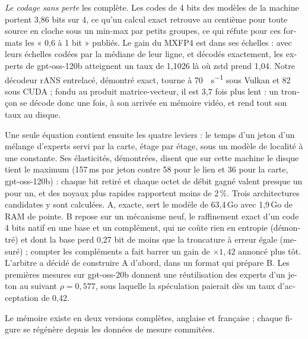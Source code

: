{\begin{otherlanguage}{french}
\emph{Le codage sans perte} les complète. Les codes de 4 bits des modèles de la machine portent 3,86 bits sur 4, ce qu'un calcul exact retrouve au centième pour toute source en cloche sous un min-max par petits groupes, ce qui réfute pour ces formats les « 0,6 à 1 bit » publiés. Le gain du MXFP4 est dans ses échelles : avec leurs échelles codées par la médiane de leur ligne, et décodés exactement, les experts de gpt-oss-120b atteignent un taux de 1,1026 là où zstd prend 1,04. Notre décodeur rANS entrelacé, démontré exact, tourne à \SI{70}{\Go\per\second} sous Vulkan et 82 sous CUDA ; fondu au produit matrice-vecteur, il est 3,7 fois plus lent : un tronçon se décode donc une fois, à son arrivée en mémoire vidéo, et rend tout son taux au disque.

Une seule équation contient ensuite les quatre leviers : le temps d'un jeton d'un mélange d'experts servi par la carte, étage par étage, sous un modèle de localité à une constante. Ses élasticités, démontrées, disent que sur cette machine le disque tient le maximum (157\,ms par jeton contre 58 pour le lien et 36 pour la carte, gpt-oss-120b) : chaque bit retiré et chaque octet de débit gagné valent presque un pour un, et des noyaux plus rapides rapportent moins de 2\,\%. Trois architectures candidates y sont calculées. A, exacte, sert le modèle de 63,4\,Go avec 1,9\,Go de RAM de pointe. B repose sur un mécanisme neuf, le raffinement exact d'un code 4 bits natif en une base et un complément, qui ne coûte rien en entropie (démontré) et dont la base perd 0,27 bit de moins que la troncature à erreur égale (mesuré) ; compter les compléments a fait barrer un gain de $\times 1{,}42$ annoncé plus tôt. L'arbitre a décidé de construire A d'abord, dans un format qui prépare B. Les premières mesures sur gpt-oss-20b donnent une réutilisation des experts d'un jeton au suivant $\rho = 0{,}577$, sous laquelle la spéculation paierait dès un taux d'acceptation de 0,42.

Le mémoire existe en deux versions complètes, anglaise et française ; chaque figure se régénère depuis les données de mesure commitées.
\end{otherlanguage}
}
\ifanglais\ResumeEN\ResumeFR\else\ResumeFR\ResumeEN\fi
